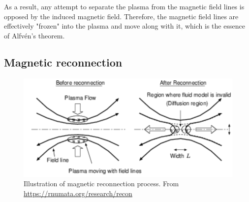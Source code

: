 As a result, any attempt to separate the plasma from the magnetic field lines is opposed by the induced magnetic field. Therefore, the magnetic field lines are effectively "frozen" into the plasma and move along with it, which is the essence of Alfvén's theorem.






\subsection{Magnetic reconnection}

\begin{figure}
    \centering
    \includegraphics{Chapter_2/Figs ch2/reconnection illustration 1.png}
    \caption{Illustration of magnetic reconnection process. From \url{https://rnumata.org/research/recon}}
    \label{fig:reconnection illustration 1}
\end{figure}

